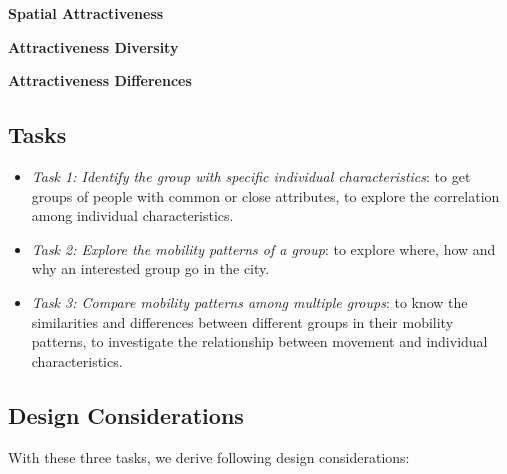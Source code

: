 \textbf{Spatial Attractiveness} 

\textbf{Attractiveness Diversity} 

\textbf{Attractiveness Differences} 

\subsection{Tasks}


\begin{itemize}
\item \textit{Task 1: Identify the group with specific individual characteristics}: to get groups of people with common or close attributes, to explore the correlation among individual characteristics.
\item \textit{Task 2: Explore the mobility patterns of a group}: to explore where, how and why an interested group go in the city.
\item \textit{Task 3: Compare mobility patterns among multiple groups}: to know the similarities and differences between different groups in their mobility patterns, to investigate the relationship between movement and individual characteristics.
\end{itemize}

\subsection{Design Considerations}

With these three tasks, we derive following design considerations:

